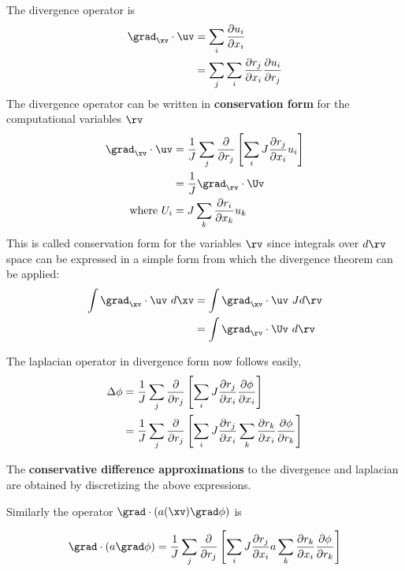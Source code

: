 The divergence operator is
\begin{align*}
 \grad_\xv \cdot \uv 
     &= \sum_i {\partial u_i \over \partial x_i } \\
     &= \sum_j \sum_i{\partial r_j \over \partial x_i } {\partial u_i \over \partial r_j } 
\end{align*}
The divergence operator can be written in {\bf conservation form} for the computational variables $\rv$
\begin{align*}
 \grad_\xv \cdot \uv 
     & = {1\over J} \sum_j 
            {\partial\over\partial r_j}\left[ \sum_i J{\partial r_j \over \partial x_i } u_i \right] \\
    &= {1\over J} \grad_\rv \cdot \Uv \\
  \mbox{where}~ U_i &= J \sum_k {\partial r_i \over \partial x_k } u_k 
\end{align*}
This is called conservation form for the variables $\rv$ since integrals over $d\rv$ space can be expressed
in a simple form from which the divergence theorem can be applied:
\begin{align*}
  \int \grad_\xv \cdot \uv ~d\xv &= \int \grad_\xv \cdot \uv ~J d\rv \\ 
     &= \int \grad_\rv \cdot \Uv ~d\rv 
\end{align*}

The laplacian operator in divergence form now follows easily,
\begin{align*}
   \Delta \phi &= {1\over J} \sum_j 
             {\partial\over\partial r_j}\left[ \sum_i J{\partial r_j \over \partial x_i } 
                   {\partial \phi \over \partial x_i} \right] \\
  &= {1\over J}  \sum_j 
            {\partial\over\partial r_j}\left[ \sum_i J{\partial r_j \over \partial x_i } 
                   \sum_k {\partial r_k \over \partial x_i }{\partial \phi \over \partial r_k} \right]
\end{align*}


The {\bf conservative difference approximations} to the divergence and laplacian are obtained by
discretizing the above expressions.


Similarly the operator $\grad\cdot( a(\xv) \grad \phi)$ is

\[
   \grad\cdot( a \grad \phi) 
  = {1\over J}  \sum_j 
            {\partial\over\partial r_j}\left[ \sum_i J{\partial r_j \over \partial x_i } 
                   a \sum_k {\partial r_k \over \partial x_i }{\partial \phi \over \partial r_k} \right] 
\]

